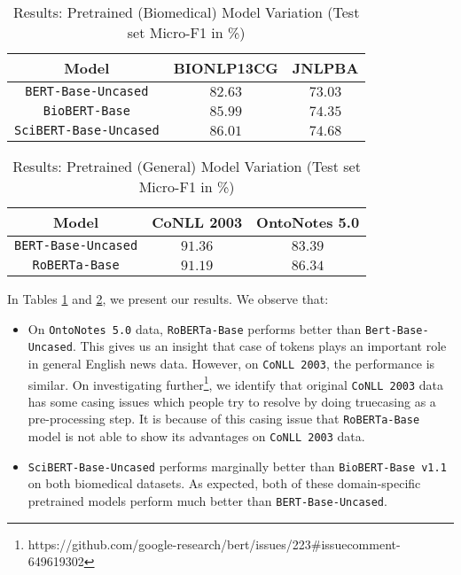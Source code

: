 \begin{table}[h!]
\centering
\begin{tabular}{|c|c|c|}\hline
	\textbf{Model} & \textbf{BIONLP13CG} & \textbf{JNLPBA}\\\hline
	\texttt{BERT-Base-Uncased} & $82.63$ & $73.03$\\\hline
	\texttt{BioBERT-Base} & $85.99$ & $74.35$\\\hline
	\texttt{SciBERT-Base-Uncased} & $86.01$ & $74.68$\\\hline
	\end{tabular}
    \caption{Results: Pretrained (Biomedical) Model Variation (Test set Micro-F1 in \%)}
    \label{tab:res_pretrained_model_bio}
\end{table}

\begin{table}[h!]
\centering
\begin{tabular}{|c|c|c|}\hline
	\textbf{Model} & \textbf{CoNLL 2003} & \textbf{OntoNotes 5.0}\\\hline
	\texttt{BERT-Base-Uncased} & $91.36$ & $83.39$\\\hline
	\texttt{RoBERTa-Base} & $91.19$ & $86.34$\\\hline
	\end{tabular}
    \caption{Results: Pretrained (General) Model Variation (Test set Micro-F1 in \%)}
    \label{tab:res_pretrained_model_general}
\end{table}

In Tables \ref{tab:res_pretrained_model_bio} and \ref{tab:res_pretrained_model_general}, we present our results. We observe that:

\begin{itemize}
    \item On \texttt{OntoNotes 5.0} data, \texttt{RoBERTa-Base} performs better than \texttt{Bert-Base-Uncased}. This gives us an insight that case of tokens plays an important role in general English news data. However, on \texttt{CoNLL 2003}, the performance is similar. On investigating further\footnote{https://github.com/google-research/bert/issues/223\#issuecomment-649619302}, we identify that original \texttt{CoNLL 2003} data has some casing issues which people try to resolve by doing truecasing as a pre-processing step. It is because of this casing issue that \texttt{RoBERTa-Base} model is not able to show its advantages on \texttt{CoNLL 2003} data.
    
    \item \texttt{SciBERT-Base-Uncased} performs marginally better than \texttt{BioBERT-Base v1.1} on both biomedical datasets. As expected, both of these domain-specific pretrained models perform much better than \texttt{BERT-Base-Uncased}. 
\end{itemize}

